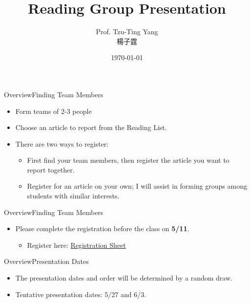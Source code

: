 \documentclass[hyperref={pdfpagelabels=false}]{beamer}
\title[]  
{Reading Group Presentation}
\author 
{Prof. Tzu-Ting Yang  \\ 楊子霆}
\institute{Institute of Economics, Academia Sinica  \\ 中央研究院經濟研究所}
\date
{\today}
\begin{document}
\begin{frame}{}
 \titlepage
\end{frame}


\begin{frame}{Overview}{Finding Team Members}
	\begin{itemize}
		\item Form teams of 2-3 people
				\vspace{0.2cm}
		\item Choose an article to report from the Reading List. 
						\vspace{0.2cm}
		\item There are two ways to register:
		\begin{itemize}
			\item First find your team members, then register the article you want to report together.
							\vspace{0.2cm}
			\item Register for an article on your own; I will assist in forming groups among students with similar interests.
							\vspace{0.2cm}
		\end{itemize}
	
		
		
	\end{itemize}
\end{frame}




\begin{frame}{Overview}{Finding Team Members}
	\begin{itemize}
	
		\item Please complete the registration before the class on \textbf{5/11}.
					\vspace{0.2cm}
				\begin{itemize}
		
		\item Register here: \href{https://docs.google.com/spreadsheets/d/10x56ko14VCkdqfcfgPh3LDjSNWkeH06k/edit?gid=1810002485\#gid=1810002485}{Registration Sheet}
		
				\end{itemize}
	\end{itemize}
\end{frame}


\begin{frame}{Overview}{Presentation Dates}
	\begin{itemize}
		\item The presentation dates and order will be determined by a random draw.
									\vspace{0.2cm}
		\item Tentative presentation dates: 5/27 and 6/3.
	\end{itemize}
\end{frame}
\end{document}
